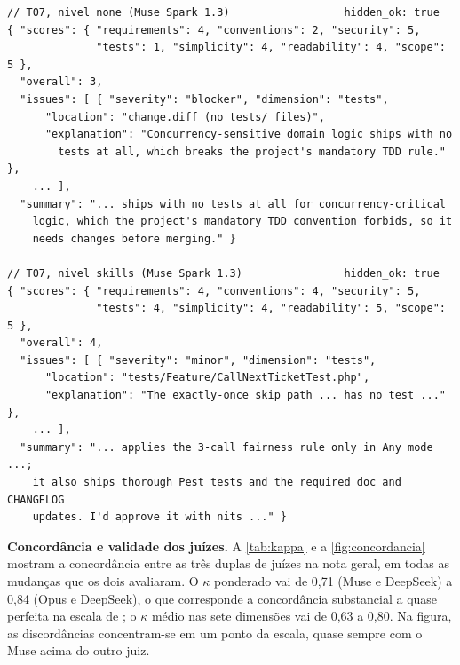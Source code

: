 \begin{lstlisting}[float=htb, caption={Revisões do juiz Opus 5.5 para o Muse Spark em T07, nos níveis \texttt{none} e \texttt{skills} (\texttt{review.json} abreviado)}, label={lst:revisao}, basicstyle=\ttfamily\footnotesize, numbers=none]
// T07, nivel none (Muse Spark 1.3)                  hidden_ok: true
{ "scores": { "requirements": 4, "conventions": 2, "security": 5,
              "tests": 1, "simplicity": 4, "readability": 4, "scope": 5 },
  "overall": 3,
  "issues": [ { "severity": "blocker", "dimension": "tests",
      "location": "change.diff (no tests/ files)",
      "explanation": "Concurrency-sensitive domain logic ships with no
        tests at all, which breaks the project's mandatory TDD rule." },
    ... ],
  "summary": "... ships with no tests at all for concurrency-critical
    logic, which the project's mandatory TDD convention forbids, so it
    needs changes before merging." }

// T07, nivel skills (Muse Spark 1.3)                hidden_ok: true
{ "scores": { "requirements": 4, "conventions": 4, "security": 5,
              "tests": 4, "simplicity": 4, "readability": 5, "scope": 5 },
  "overall": 4,
  "issues": [ { "severity": "minor", "dimension": "tests",
      "location": "tests/Feature/CallNextTicketTest.php",
      "explanation": "The exactly-once skip path ... has no test ..." },
    ... ],
  "summary": "... applies the 3-call fairness rule only in Any mode ...;
    it also ships thorough Pest tests and the required doc and CHANGELOG
    updates. I'd approve it with nits ..." }
\end{lstlisting}

\textbf{Concordância e validade dos juízes.} A \autoref{tab:kappa} e a
\autoref{fig:concordancia} mostram a concordância entre as três duplas de
juízes na nota geral, em todas as mudanças que os dois avaliaram. O $\kappa$
ponderado vai de 0,71 (Muse e DeepSeek) a 0,84 (Opus e DeepSeek), o que
corresponde a concordância substancial a quase perfeita na escala de
; o $\kappa$ médio nas sete dimensões vai de 0,63 a
0,80. Na figura, as discordâncias concentram-se em um ponto da escala, quase
sempre com o Muse acima do outro juiz.

